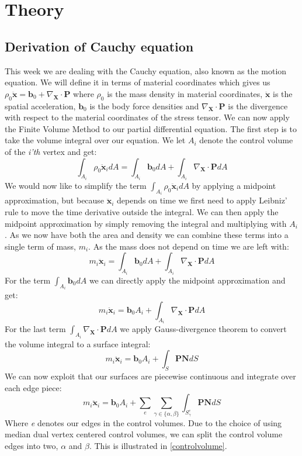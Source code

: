 \section{Theory}
\subsection{Derivation of Cauchy equation}
This week we are dealing with the Cauchy equation, also known as the motion equation. We will define it in terms of material coordinates which gives us $\rho_0 \ddot{\mathbf{x}} = \mathbf{b}_0 + \nabla_{\mathbf{X}}\cdot \mathbf{P}$ where $\rho_0$ is the mass density in material coordinates, $\ddot{\mathbf{x}}$ is the spatial acceleration, $\mathbf{b}_0$ is the body force densities and $\nabla_{\mathbf{X}}\cdot \mathbf{P}$ is the divergence with respect to the material coordinates of the stress tensor. We can now apply the Finite Volume Method to our partial differential equation. The first step is to take the volume integral over our equation. We let $A_i$ denote the control volume of the \textit{i'th} vertex and get:
\begin{equation*}
	\int_{A_i}\rho_0 \ddot{\mathbf{x}}_i dA = \int_{A_i}\mathbf{b}_0dA + \int_{A_i}\nabla_{\mathbf{X}}\cdot \mathbf{P}dA
\end{equation*}
We would now like to simplify the term $\int_{A_i}\rho_0 \ddot{\mathbf{x}}_i dA$ by applying a midpoint approximation, but because $\ddot{\mathbf{x}}_i$ depends on time we first need to apply Leibniz' rule to move the time derivative outside the integral. We can then apply the midpoint approximation by simply removing the integral and multiplying with $A_i$. As we now have both the area and density we can combine these terms into a single term of mass, $m_i$. As the mass does not depend on time we are left with:
\begin{equation*}
	m_i\ddot{\mathbf{x}}_i = \int_{A_i}\mathbf{b}_0dA + \int_{A_i}\nabla_{\mathbf{X}}\cdot \mathbf{P}dA
\end{equation*}
For the term $\int_{A_i}\mathbf{b}_0dA$ we can directly apply the midpoint approximation and get:
\begin{equation*}
	m_i\ddot{\mathbf{x}}_i = \mathbf{b}_0A_i + \int_{A_i}\nabla_{\mathbf{X}}\cdot \mathbf{P}dA
\end{equation*}
For the last term $\int_{A_i}\nabla_{\mathbf{X}}\cdot \mathbf{P}dA$ we apply Gauss-divergence theorem to convert the volume integral to a surface integral:
\begin{equation*}
	m_i\ddot{\mathbf{x}}_i = \mathbf{b}_0A_i + \int_{S}\mathbf{P}\mathbf{N}dS
\end{equation*}
We can now exploit that our surfaces are piecewise continuous and integrate over each edge piece:
\begin{equation*}
	m_i\ddot{\mathbf{x}}_i = \mathbf{b}_0A_i + \sum_e \sum_{\gamma\in \{\alpha,\beta\}} \int_{S^e_\gamma}\mathbf{P}\mathbf{N}dS
\end{equation*}
Where \textit{e} denotes our edges in the control volumes. Due to the choice of using median dual vertex centered control volumes, we can split the control volume edges into two, $\alpha$ and $\beta$. This is illustrated in \autoref{controlvolume}.

